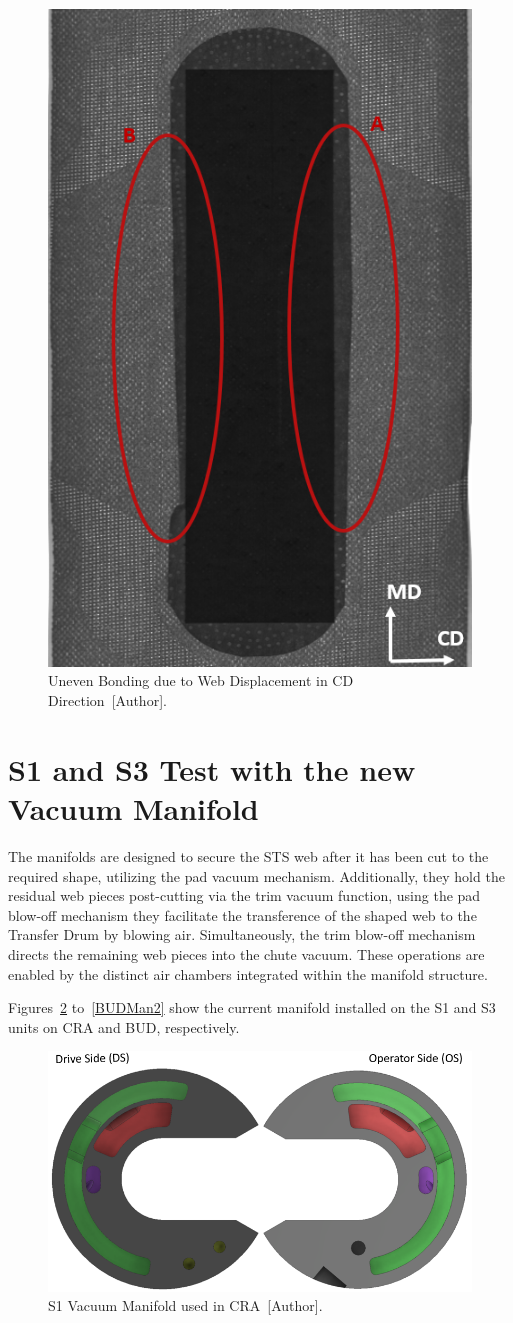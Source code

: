 \begin{figure}[H]
    \centering
    \includegraphics[width=0.5\linewidth]{FIGURES/BOEL15.png}
    \caption{Uneven Bonding due to Web Displacement in CD Direction~[Author].}
    \label{BOEL15}
\end{figure}

\section{S1 and S3 Test with the new Vacuum Manifold}

The manifolds are designed to secure the STS web after it has been cut to the required shape, utilizing the pad vacuum mechanism. Additionally, they hold the residual web pieces post-cutting via the trim vacuum function, using the pad blow-off mechanism they facilitate the transference of the shaped web to the Transfer Drum by blowing air. Simultaneously, the trim blow-off mechanism directs the remaining web pieces into the chute vacuum. These operations are enabled by the distinct air chambers integrated within the manifold structure.

Figures~\ref{CRAMan1} to~\ref{BUDMan2} show the current manifold installed on the S1 and S3 units on CRA and BUD, respectively.

\begin{figure}[H]
    \centering
    \includegraphics[width=1\linewidth]{FIGURES/S1CRAMan.png}
    \caption{S1 Vacuum Manifold used in CRA~[Author].}
    \label{CRAMan1}
\end{figure}

